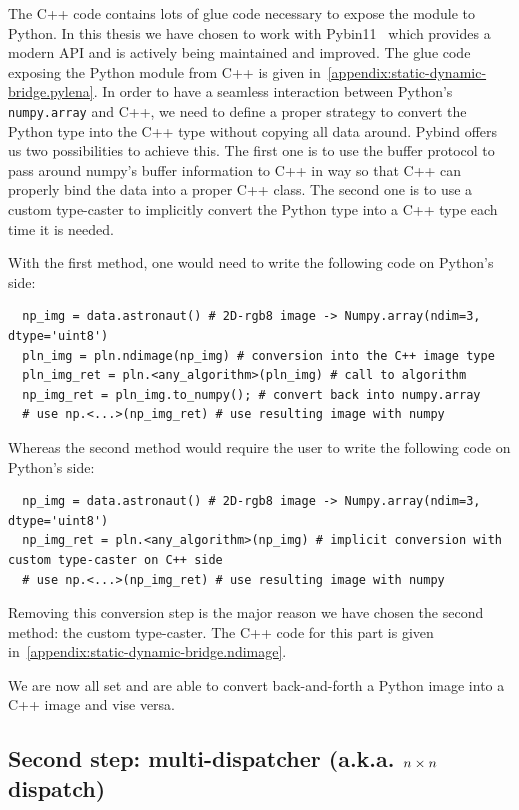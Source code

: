 The C++ code contains lots of glue code necessary to expose the module to Python. In this thesis we have chosen to work
with Pybin11~\parencite{jakob.2017.pybind11} which provides a modern API and is actively being maintained and improved.
The glue code exposing the Python module from C++ is given in~\cref{appendix:static-dynamic-bridge.pylena}. In order to
have a seamless interaction between Python's \texttt{numpy.array} and C++, we need to define a proper strategy to
convert the Python type into the C++ type without copying all data around. Pybind offers us two possibilities to achieve
this. The first one is to use the buffer protocol to pass around numpy's buffer information to C++ in way so that C++
can properly bind the data into a proper C++ class. The second one is to use a custom type-caster to implicitly convert
the Python type into a C++ type each time it is needed.

With the first method, one would need to write the following code on Python's side:
\begin{verbatim}
  np_img = data.astronaut() # 2D-rgb8 image -> Numpy.array(ndim=3, dtype='uint8')
  pln_img = pln.ndimage(np_img) # conversion into the C++ image type
  pln_img_ret = pln.<any_algorithm>(pln_img) # call to algorithm
  np_img_ret = pln_img.to_numpy(); # convert back into numpy.array
  # use np.<...>(np_img_ret) # use resulting image with numpy
\end{verbatim}
Whereas the second method would require the user to write the following code on Python's side:
\begin{verbatim}
  np_img = data.astronaut() # 2D-rgb8 image -> Numpy.array(ndim=3, dtype='uint8')
  np_img_ret = pln.<any_algorithm>(np_img) # implicit conversion with custom type-caster on C++ side
  # use np.<...>(np_img_ret) # use resulting image with numpy
\end{verbatim}
Removing this conversion step is the major reason we have chosen the second method: the custom type-caster. The C++ code
for this part is given in~\cref{appendix:static-dynamic-bridge.ndimage}.

We are now all set and are able to convert back-and-forth a Python image into a C++ image and vise versa.

\subsection{Second step: multi-dispatcher (a.k.a. \(\protect n \times n\) dispatch)}

